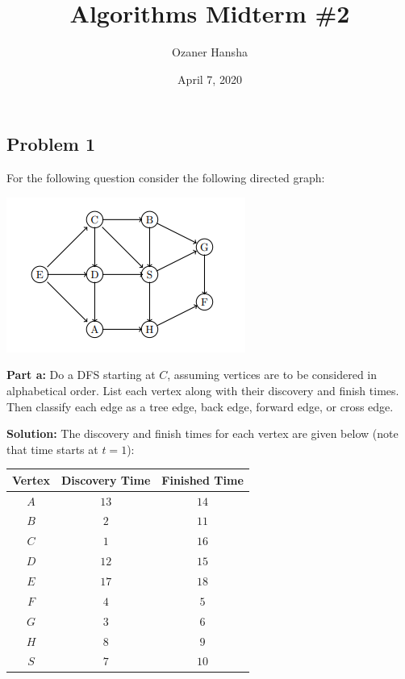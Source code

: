 \documentclass{article}
\begin{document}
\title{Algorithms Midterm \#2}
\author{Ozaner Hansha}
\date{April 7, 2020}
\maketitle

\subsection*{Problem 1}
For the following question consider the following directed graph:
\begin{center}
  \includegraphics{graph.png}
\end{center}

\noindent\textbf{Part a:} Do a DFS starting at $C$, assuming vertices are to be considered in alphabetical order. List each vertex along with their discovery and finish times. Then classify each edge as a tree edge, back edge, forward edge, or cross edge.
\bigskip

\noindent\textbf{Solution:} The discovery and finish times for each vertex are given below (note that time starts at $t=1$):
\begin{center}
  \begin{tabular}{c|c|c}
        Vertex & Discovery Time & Finished Time \\
        \hline
        $A$ & $13$ & $14$\\
        $B$ & $2$ & $11$\\
        $C$ & $1$ & $16$\\
        $D$ & $12$ & $15$\\
        $E$ & $17$ & $18$\\
        $F$ & $4$ & $5$\\
        $G$ & $3$ & $6$\\
        $H$ & $8$ & $9$\\
        $S$ & $7$ & $10$
  \end{tabular}
\end{center}
\medskip
\end{document}

